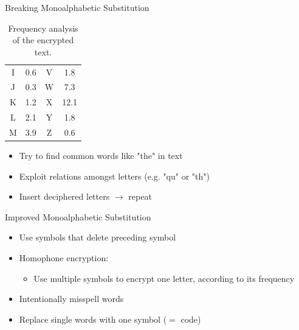 \documentclass[]{beamer}
\begin{document}
\begin{frame}{Breaking Monoalphabetic Substitution}
\begin{minipage}[t]{0.45\textwidth}
{\begin{table}
{\begin{tabular}{c c c c}
						I & 0.6 & V & 1.8\\
						J & 0.3 & W & 7.3\\
						K & 1.2 & X & 12.1\\
						L & 2.1 & Y & 1.8\\
						M & 3.9 & Z & 0.6\\
						\hline
					\end{tabular}
				}
				\caption{Frequency analysis of the encrypted text.}
		\end{table}}
	\end{minipage}
	\vspace{-0.4cm}
	\begin{itemize}
		\item<3-> Try to find common words like "the" in text
		\item<4-> Exploit relations amongst letters (e.g. "qu" or "th")
		\item<5-> Insert deciphered letters \(\rightarrow\) repeat
	\end{itemize}
\end{frame}

\begin{frame}{Improved Monoalphabetic Substitution}
	\begin{itemize}
		\item<1-> Use symbols that delete preceding symbol
		\item<2-> Homophone encryption:
		\begin{itemize}
			\item<2-> Use multiple symbols to encrypt one letter, according to its frequency
		\end{itemize}
		\item<3-> Intentionally misspell words
		\item<4-> Replace single words with one symbol ($=$ code)
	\end{itemize}
\end{frame}
\end{document}
